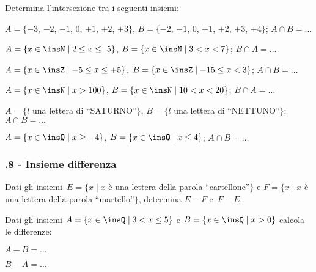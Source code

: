 \begin{esercizio}
 \label{ese:\thechapter.59}
 Determina l'intersezione tra i seguenti insiemi:
\begin{enumeratea}
 \item $A=\{-3$, $-2$, $-1$, $0$, $+1$, $+2$, $+3\}$, $B=\{-2$, $-1$, $0$, $+1$, $+2$, $+3$, $+4\}$; $A\cap B=\ldots$
 \item $A=\{x\in\insN\mid 2\le x\le~5\}$, $B=\{x\in\insN\mid 3<x<7\}$; $B\cap A=\ldots$
 \item $A=\{x\in\insZ\mid -5\le x\le+5\}$, $B=\{x\in\insZ\mid -15\le x<3\}$; $A\cap B=\ldots$
 \item $A=\{x\in\insN\mid x>100\}$, $B=\{x\in\insN\mid 10<x<20\}$; $B\cap A=\ldots$
 \item $A=\{l$ una lettera di ``SATURNO''$\}$, $B=\{l$ una lettera di ``NETTUNO''$\}$; $A\cap B=\ldots$
 \item $A=\{x\in\insQ\mid x\ge -4\}$, $B=\{x\in\insQ\mid x\le 4\}$; $A\cap B=\ldots$
\end{enumeratea}
\end{esercizio}

\subsubsection*{\thechapter.8 - Insieme differenza}
\begin{esercizio}
\label{ese:\thechapter.60}
Dati gli insiemi~$E=\{x\mid x$ è una lettera della parola ``cartellone''$\}$ e
$F=\{x\mid x$ è una lettera della parola ``martello''$\}$, determina
$E-F$ e~$F-E$.
\end{esercizio}

\begin{esercizio}
\label{ese:\thechapter.61}
Dati gli insiemi $A=\{x\in\insQ\mid 3<x\le 5\}$ e $B=\{x\in\insQ\mid x>0\}$ calcola le differenze:
\begin{multicols}{2}
\begin{enumeratea}
 \item $A-B=\ldots$
 \item $B-A=\ldots$
\end{enumeratea}
\end{multicols}
\end{esercizio}


